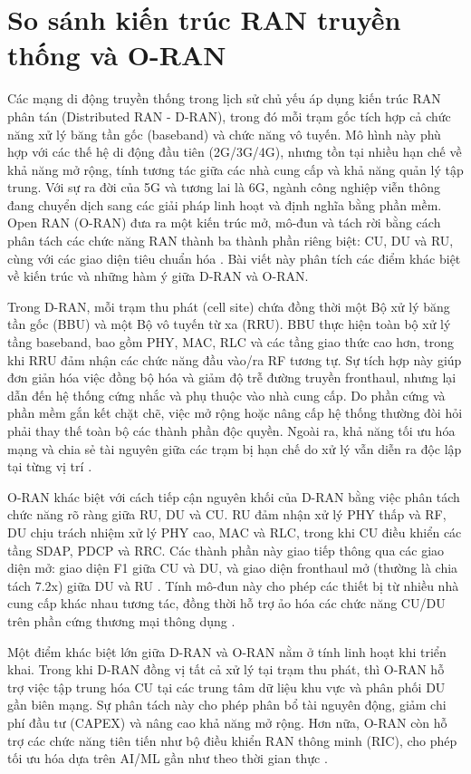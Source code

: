 \section{So sánh kiến trúc RAN truyền thống và O-RAN}
Các mạng di động truyền thống trong lịch sử chủ yếu áp dụng kiến trúc RAN phân tán (Distributed RAN - D-RAN), trong đó mỗi trạm gốc tích hợp cả chức năng xử lý băng tần gốc (baseband) và chức năng vô tuyến. Mô hình này phù hợp với các thế hệ di động đầu tiên (2G/3G/4G), nhưng tồn tại nhiều hạn chế về khả năng mở rộng, tính tương tác giữa các nhà cung cấp và khả năng quản lý tập trung. Với sự ra đời của 5G và tương lai là 6G, ngành công nghiệp viễn thông đang chuyển dịch sang các giải pháp linh hoạt và định nghĩa bằng phần mềm. Open RAN (O-RAN) đưa ra một kiến trúc mở, mô-đun và tách rời bằng cách phân tách các chức năng RAN thành ba thành phần riêng biệt: CU, DU và RU, cùng với các giao diện tiêu chuẩn hóa \cite{oran-wg6-architecture}. Bài viết này phân tích các điểm khác biệt về kiến trúc và những hàm ý giữa D-RAN và O-RAN.

Trong D-RAN, mỗi trạm thu phát (cell site) chứa đồng thời một Bộ xử lý băng tần gốc (BBU) và một Bộ vô tuyến từ xa (RRU). BBU thực hiện toàn bộ xử lý tầng baseband, bao gồm PHY, MAC, RLC và các tầng giao thức cao hơn, trong khi RRU đảm nhận các chức năng đầu vào/ra RF tương tự. Sự tích hợp này giúp đơn giản hóa việc đồng bộ hóa và giảm độ trễ đường truyền fronthaul, nhưng lại dẫn đến hệ thống cứng nhắc và phụ thuộc vào nhà cung cấp. Do phần cứng và phần mềm gắn kết chặt chẽ, việc mở rộng hoặc nâng cấp hệ thống thường đòi hỏi phải thay thế toàn bộ các thành phần độc quyền. Ngoài ra, khả năng tối ưu hóa mạng và chia sẻ tài nguyên giữa các trạm bị hạn chế do xử lý vẫn diễn ra độc lập tại từng vị trí \cite{3gpp-tr38.801}.

O-RAN khác biệt với cách tiếp cận nguyên khối của D-RAN bằng việc phân tách chức năng rõ ràng giữa RU, DU và CU. RU đảm nhận xử lý PHY thấp và RF, DU chịu trách nhiệm xử lý PHY cao, MAC và RLC, trong khi CU điều khiển các tầng SDAP, PDCP và RRC. Các thành phần này giao tiếp thông qua các giao diện mở: giao diện F1 giữa CU và DU, và giao diện fronthaul mở (thường là chia tách 7.2x) giữa DU và RU \cite{khurshid2024oran}. Tính mô-đun này cho phép các thiết bị từ nhiều nhà cung cấp khác nhau tương tác, đồng thời hỗ trợ ảo hóa các chức năng CU/DU trên phần cứng thương mại thông dụng \cite{ericsson-openran}.

Một điểm khác biệt lớn giữa D-RAN và O-RAN nằm ở tính linh hoạt khi triển khai. Trong khi D-RAN đồng vị tất cả xử lý tại trạm thu phát, thì O-RAN hỗ trợ việc tập trung hóa CU tại các trung tâm dữ liệu khu vực và phân phối DU gần biên mạng. Sự phân tách này cho phép phân bổ tài nguyên động, giảm chi phí đầu tư (CAPEX) và nâng cao khả năng mở rộng. Hơn nữa, O-RAN còn hỗ trợ các chức năng tiên tiến như bộ điều khiển RAN thông minh (RIC), cho phép tối ưu hóa dựa trên AI/ML gần như theo thời gian thực \cite{oran-wg6-architecture}.

